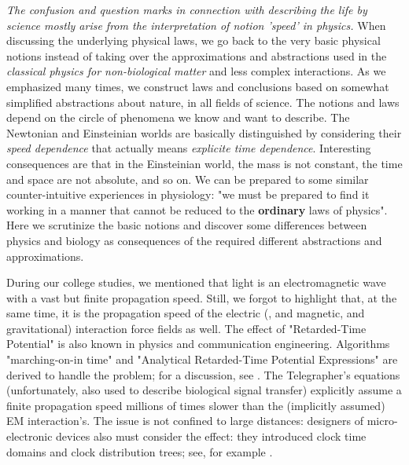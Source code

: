 {
\textit{The confusion and question marks in connection with describing the life by science mostly arise from the interpretation of
	notion 'speed' in physics.}
When discussing the underlying physical laws, we
go back to the very basic physical notions instead of taking over the
approximations and abstractions
used in the \textit{classical physics for non-biological matter} and
less complex interactions.
As we emphasized many times, we construct laws and conclusions based
on somewhat simplified abstractions about nature, in all fields of science.
The notions and laws depend
on the circle of phenomena we know and want to describe.
The Newtonian and Einsteinian worlds are
basically distinguished by considering their \textit{speed dependence} that actually means \textit{explicite time dependence}.
Interesting consequences are that in the Einsteinian world,
the mass is not constant, the time and space are not absolute, and so on.
We can be prepared to some similar counter-intuitive experiences in physiology: "we must be prepared to find it working in a manner that cannot be reduced to the \textbf{ordinary} laws of physics"\cite{Schrodinger:1992}.
Here we scrutinize the basic notions and discover some differences
between physics and biology
as consequences of the required different abstractions and approximations.



During our college studies, we mentioned that light is an electromagnetic
wave with a vast but finite propagation speed. Still, we forgot to
highlight that, at the same time, it is the propagation speed of the
electric (, and magnetic, and gravitational) interaction force fields
as well. The effect of "Retarded-Time Potential" is also known
in physics and communication engineering. Algorithms "marching-on-in
time" and "Analytical Retarded-Time Potential Expressions" are
derived to handle the problem; for a discussion, see \cite{RetardedTimePotential:2011}.
The Telegrapher's equations (unfortunately, also used to describe biological signal transfer)
explicitly assume a finite propagation speed millions of times slower
than the (implicitly assumed) \gls{EM} 
interaction's. The issue is not confined to large
distances: designers of micro-electronic devices also must consider
the effect: they introduced clock time domains and clock distribution
trees; see, for example \cite{WiringDominance:2019, VeghRevisingClassicComputing:2021}.
}

